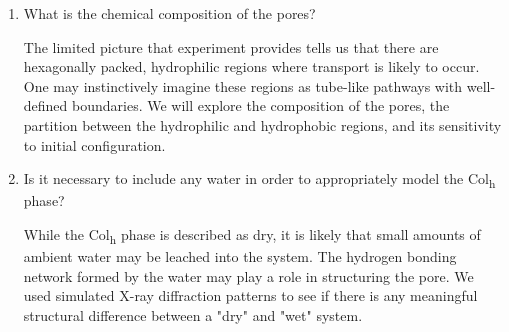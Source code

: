 \documentclass[journal=jpcbfk,manusciprt=article]{achemso}
\begin{document}
\begin{enumerate}
	\item What is the chemical composition of the pores?\label{point:composition}

	The limited picture that experiment provides tells us that there are hexagonally packed, 
	hydrophilic regions where transport is likely to occur. One may instinctively imagine these 
	regions as tube-like pathways with well-defined boundaries. We will explore the composition
	of the pores, the partition between the hydrophilic and hydrophobic regions, and its 
	sensitivity to initial configuration. 
	
    \item Is it necessary to include any water in order to appropriately model the 
    Col\textsubscript{h} phase? \label{point:water}

	While the Col\textsubscript{h} phase is described as dry, it is likely that small amounts of
	ambient water may be leached into the system. The hydrogen bonding network formed by the 
	water may play a role in structuring the pore. We used simulated X-ray diffraction patterns
	to see if there is any meaningful structural difference between a "dry" and "wet" system.

  \end{enumerate}
  
%
\end{document}
